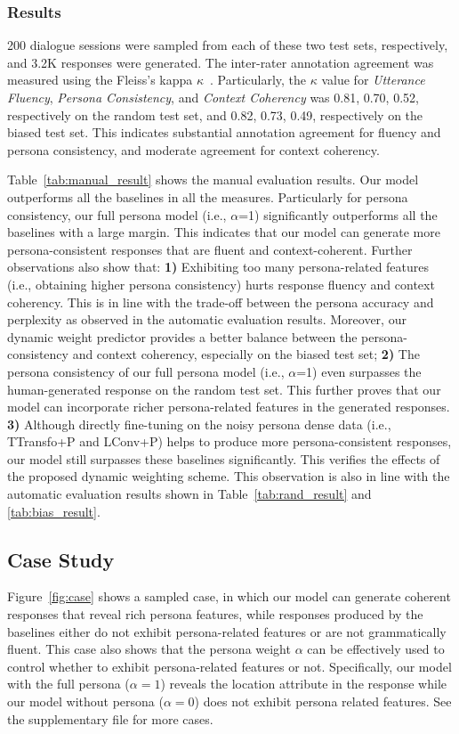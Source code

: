 \documentclass[letterpaper]{article} %
\newcommand{\citep}{\cite}
\begin{document}
\subsubsection{Results}
200 dialogue sessions were sampled from each of these two test sets, respectively, and 3.2K responses were generated. The inter-rater annotation agreement was measured using the Fleiss's kappa $\kappa$~\citep{randolph2005free}. Particularly, the $\kappa$ value for \emph{Utterance Fluency}, \emph{Persona Consistency}, and \emph{Context Coherency} was 0.81, 0.70, 0.52, respectively on the random test set, and 0.82, 0.73, 0.49, respectively on the biased test set. This indicates substantial annotation agreement for fluency and persona consistency, and moderate agreement for context coherency.

Table~\ref{tab:manual_result} shows the manual evaluation results. Our model outperforms all the baselines in all the measures. Particularly for persona consistency, our full persona model (i.e., $\alpha$=1) significantly outperforms all the baselines with a large margin. This indicates that our model can generate more persona-consistent responses that are fluent and context-coherent. Further observations also show that:
\textbf{1)} Exhibiting too many persona-related features (i.e., obtaining higher persona consistency) hurts response fluency and context coherency. This is in line with the trade-off between the persona accuracy and perplexity as observed in the automatic evaluation results. Moreover, our dynamic weight predictor provides a better balance between the persona-consistency and context coherency, especially on the biased test set;
\textbf{2)} The persona consistency of our full persona model (i.e., $\alpha$=1) even surpasses the human-generated response on the random test set. This further proves that our model can incorporate richer persona-related features in the generated responses.
\textbf{3)} Although directly fine-tuning on the noisy persona dense data (i.e., TTransfo+P and LConv+P) helps to produce more persona-consistent responses, our model still surpasses these baselines significantly. This verifies the effects of the proposed dynamic weighting scheme. This observation is also in line with the automatic evaluation results shown in Table~\ref{tab:rand_result} and \ref{tab:bias_result}.

\subsection{Case Study}
Figure~\ref{fig:case} shows a sampled case, in which our model can generate coherent responses that reveal rich persona features, while responses produced by the baselines either do not exhibit persona-related features or are not grammatically fluent. This case also shows that the persona weight $\alpha$ can be effectively used to control whether to exhibit persona-related features or not. Specifically, our model with the full persona ($\alpha=1$) reveals the location attribute in the response while our model without persona ($\alpha=0$) does not exhibit persona related features. See the supplementary file for more cases.
\end{document}
